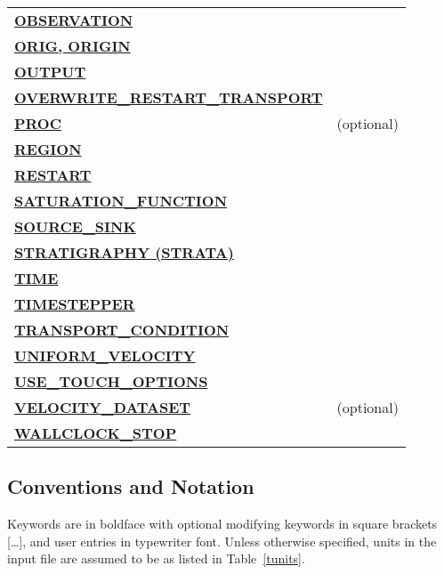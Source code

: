\begin{longtable}{ll}
\hyperlink{target_observation}{\bf OBSERVATION} & \\
\hyperlink{target_orig}{\bf ORIG, ORIGIN} & \\
\hyperlink{target_output}{\bf OUTPUT} & \\
\hyperlink{target_overwrite}{\bf OVERWRITE\_RESTART\_TRANSPORT} & \\
\hyperlink{target_proc}{\bf PROC} & (optional)\\
\hyperlink{target_region}{\bf REGION} & \\
\hyperlink{target_restart}{\bf RESTART} & \\
\hyperlink{target_sat}{\bf SATURATION\_FUNCTION} & \\
\hyperlink{target_src}{\bf SOURCE\_SINK} & \\
\hyperlink{target_strata}{\bf STRATIGRAPHY (STRATA)} & \\
\hyperlink{target_time}{\bf TIME} & \\
\hyperlink{target_timestep}{\bf TIMESTEPPER} & \\
\hyperlink{target_trans_cond}{\bf TRANSPORT\_CONDITION} & \\
\hyperlink{target_unifvel}{\bf UNIFORM\_VELOCITY} & \\
\hyperlink{target_touch}{\bf USE\_TOUCH\_OPTIONS} & \\
\hyperlink{target_veldata}{\bf VELOCITY\_DATASET} & (optional) \\
\hyperlink{target_wallclk}{\bf WALLCLOCK\_STOP} & \\
\bottomrule[1.5pt]
\end{longtable}


\subsection{\bf Conventions and Notation} 

Keywords are in boldface with optional modifying keywords in square brackets [\ldots], and user entries in typewriter font.
Unless otherwise specified, units in the input file are assumed to be as listed in Table~\ref{tunits}.

